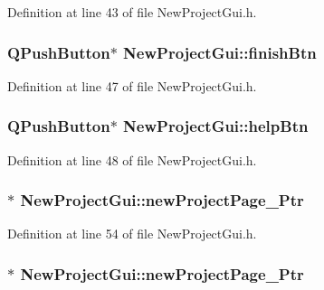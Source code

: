 Definition at line 43 of file New\-Project\-Gui.\-h.

\hypertarget{class_new_project_gui_ab5d0c64c04e2c9c1ff6e57191e35f79f}{
\subsubsection[{finish\-Btn}]{\setlength{\rightskip}{0pt plus 5cm}Q\-Push\-Button$\ast$ New\-Project\-Gui\-::finish\-Btn\hspace{0.3cm}{\ttfamily [private]}}}\label{class_new_project_gui_ab5d0c64c04e2c9c1ff6e57191e35f79f}


Definition at line 47 of file New\-Project\-Gui.\-h.

\hypertarget{class_new_project_gui_a33ab8b2813bd5f5ae52c7d91c996f61f}{
\subsubsection[{help\-Btn}]{\setlength{\rightskip}{0pt plus 5cm}Q\-Push\-Button$\ast$ New\-Project\-Gui\-::help\-Btn\hspace{0.3cm}{\ttfamily [private]}}}\label{class_new_project_gui_a33ab8b2813bd5f5ae52c7d91c996f61f}


Definition at line 48 of file New\-Project\-Gui.\-h.

\hypertarget{class_new_project_gui_a21cb8b6c6a0b743e7bdc2e4e4ff7e839}{
\subsubsection[{new\-Project\-Page\-\_\-1\-Ptr}]{$\ast$ New\-Project\-Gui\-::new\-Project\-Page\-\_\-Ptr\hspace{0.3cm}{\ttfamily [private]}}}\label{class_new_project_gui_a21cb8b6c6a0b743e7bdc2e4e4ff7e839}


Definition at line 54 of file New\-Project\-Gui.\-h.

\hypertarget{class_new_project_gui_a4437d1c791747dcf286ef389f952116a}{
\subsubsection[{new\-Project\-Page\-\_\-2\-Ptr}]{$\ast$ New\-Project\-Gui\-::new\-Project\-Page\-\_\-Ptr\hspace{0.3cm}{\ttfamily [private]}}}\label{class_new_project_gui_a4437d1c791747dcf286ef389f952116a}


